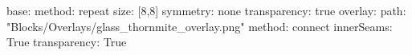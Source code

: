 base:
  method: repeat
  size: [8,8]
  symmetry: none
  transparency: true
overlay:
  path: "Blocks/Overlays/glass_thornmite_overlay.png"
  method: connect
  innerSeams: True
  transparency: True